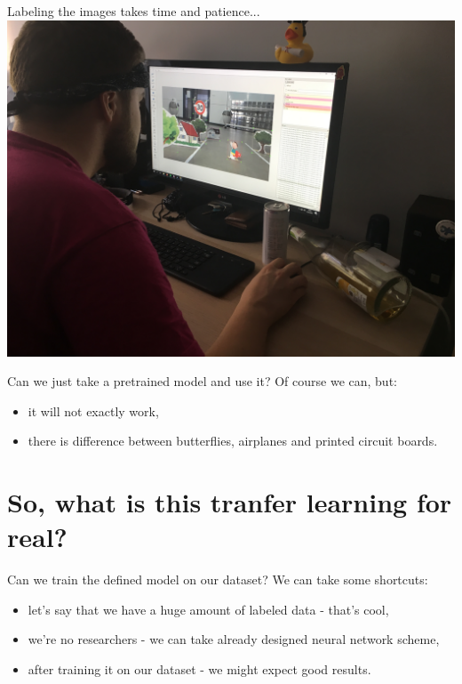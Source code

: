 \documentclass[aspectratio=1610,english]{beamer} %
\begin{document}
	\begin{frame}{Labeling the images takes time and patience...}
		\includegraphics[scale=0.1]{images/kuba}
	\end{frame}

 	\begin{frame}{Can we just take a pretrained model and use it?}
 		Of course we can, but:
		 \begin{itemize}
		 	\item it will not exactly work,
		 	\item there is difference between butterflies, airplanes and printed circuit boards.
		 \end{itemize}
	\end{frame}

\section{So, what is this tranfer learning for real?}
 	\begin{frame}{Can we train the defined model on our dataset?}
 	We can take some shortcuts:
		\begin{itemize}
			\item let's say that we have a huge amount of labeled data - that's cool,
			\item we're no researchers - we can take already designed neural network scheme,
			\item after training it on our dataset - we might expect good results.
		\end{itemize}
	\end{frame}
 
\end{document}
